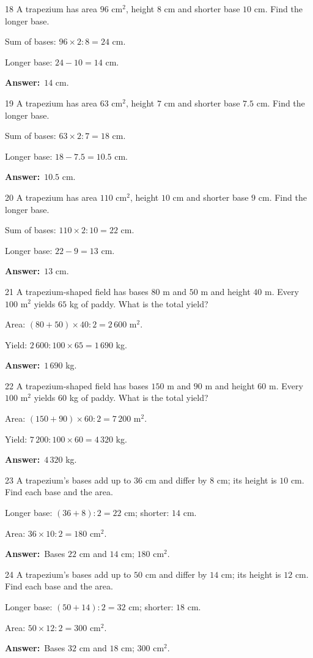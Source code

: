 \documentclass[11pt]{article}
\newif\ifsol \solfalse
\providecommand{\AnsWord}{Đáp số}
\newcommand{\dapso}[1]{\par\textbf{\AnsWord:}\ #1}
\newcommand{\probsol}[1]{%
  \begin{lrbox}{\solmeasure}\begin{minipage}{\dimexpr\linewidth-24pt\relax}#1\end{minipage}\end{lrbox}%
  \ifsol
    \begin{solbox}#1\end{solbox}%
  \else
    \setlength{\solht}{\dimexpr\ht\solmeasure+\dp\solmeasure+0.85cm\relax}%
    \ifdim\solht<1.35cm\setlength{\solht}{1.35cm}\fi
    \begin{tcolorbox}[colback=white,colframe=Line,boxrule=0.8pt,arc=5pt,
      left=8pt,right=8pt,top=4pt,bottom=4pt,height=\solht]{\footnotesize\color{Slate}\itshape\WorkWord}\end{tcolorbox}%
  \fi}
\newcommand{\gap}{\vspace{0.3cm}}
\def\WorkWord{Your work:}
\def\AnsWord{Answer}
\begin{document}
\gap
\begin{probbox}{18}{\relax}
A trapezium has area $96$ cm$^2$, height $8$ cm and shorter base $10$ cm. Find the longer base.
\end{probbox}
\probsol{
Sum of bases: $96\times2:8=24$ cm.\par Longer base: $24-10=14$ cm.
\dapso{$14$ cm.}}
\gap
\begin{probbox}{19}{\relax}
A trapezium has area $63$ cm$^2$, height $7$ cm and shorter base $7.5$ cm. Find the longer base.
\end{probbox}
\probsol{
Sum of bases: $63\times2:7=18$ cm.\par Longer base: $18-7.5=10.5$ cm.
\dapso{$10.5$ cm.}}
\gap
\begin{probbox}{20}{\relax}
A trapezium has area $110$ cm$^2$, height $10$ cm and shorter base $9$ cm. Find the longer base.
\end{probbox}
\probsol{
Sum of bases: $110\times2:10=22$ cm.\par Longer base: $22-9=13$ cm.
\dapso{$13$ cm.}}
\gap
\begin{probbox}{21}{\relax}
A trapezium-shaped field has bases $80$ m and $50$ m and height $40$ m. Every $100$ m$^2$ yields $65$ kg of paddy. What is the total yield?
\end{probbox}
\probsol{
Area: $(80+50)\times40:2=2\,600$ m$^2$.\par Yield: $2\,600:100\times65=1\,690$ kg.
\dapso{$1\,690$ kg.}}
\gap
\begin{probbox}{22}{\relax}
A trapezium-shaped field has bases $150$ m and $90$ m and height $60$ m. Every $100$ m$^2$ yields $60$ kg of paddy. What is the total yield?
\end{probbox}
\probsol{
Area: $(150+90)\times60:2=7\,200$ m$^2$.\par Yield: $7\,200:100\times60=4\,320$ kg.
\dapso{$4\,320$ kg.}}
\gap
\begin{probbox}{23}{\relax}
A trapezium's bases add up to $36$ cm and differ by $8$ cm; its height is $10$ cm. Find each base and the area.
\end{probbox}
\probsol{
Longer base: $(36+8):2=22$ cm; shorter: $14$ cm.\par Area: $36\times10:2=180$ cm$^2$.
\dapso{Bases $22$ cm and $14$ cm; $180$ cm$^2$.}}
\gap
\begin{probbox}{24}{\relax}
A trapezium's bases add up to $50$ cm and differ by $14$ cm; its height is $12$ cm. Find each base and the area.
\end{probbox}
\probsol{
Longer base: $(50+14):2=32$ cm; shorter: $18$ cm.\par Area: $50\times12:2=300$ cm$^2$.
\dapso{Bases $32$ cm and $18$ cm; $300$ cm$^2$.}}
\end{document}
